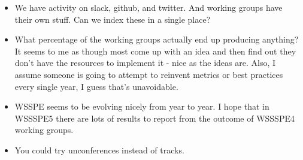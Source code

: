 \begin{enumerate}
\begin{itemize}
\item We have activity on slack, github, and twitter. And working groups have their own stuff. Can we index these in a single place?
\item What percentage of the working groups actually end up producing anything? It seems to me as though most come up with an idea and then find out they don't have the resources to implement it - nice as the ideas are. Also, I assume someone is going to attempt to reinvent metrics or best practices every single year, I guess that's unavoidable.
\item WSSPE seems to be evolving nicely from year to year.  I hope that in WSSSPE5 there are lots of results to report from the outcome of WSSSPE4 working groups.
\item You could try unconferences instead of tracks.
\end{itemize}

\end{enumerate}
